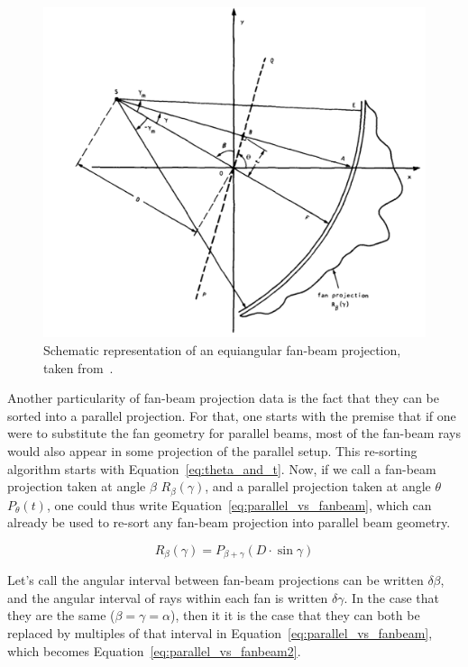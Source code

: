 \begin{figure}[htpb]
    \centering
    \includegraphics[width=.8\textwidth]{img/png/fig319.png}
    \caption{Schematic representation of an equiangular fan-beam
    projection, taken from~\cite{Kak2001}.}
    \label{fig:equiangular}
\end{figure}

Another particularity of fan-beam projection data is the fact that they
can be sorted into a parallel projection. For that, one starts with the
premise that if one were to substitute the fan geometry for parallel
beams, most of the fan-beam rays would also appear in some projection of
the parallel setup. This re-sorting algorithm starts with
Equation~\ref{eq:theta_and_t}. Now, if we call a fan-beam projection
taken at angle $\beta$ $R_{\beta}(\gamma)$, and a parallel projection
taken at angle $\theta$ $P_{\theta}(t)$, one could thus write
Equation~\ref{eq:parallel_vs_fanbeam}, which can already be used to
re-sort any fan-beam projection into parallel beam geometry.

\begin{equation}
    \label{eq:parallel_vs_fanbeam}
    R_{\beta}(\gamma) = P_{\beta + \gamma}(D \cdot \sin \gamma)
\end{equation}

Let's call the angular interval between fan-beam projections can be
written $\delta\beta$, and the angular interval of rays within each fan
is written $\delta\gamma$. In the case that they are the same
($\beta=\gamma=\alpha$), then it it is the case that they can both be
replaced by multiples of that interval in
Equation~\ref{eq:parallel_vs_fanbeam}, which becomes
Equation~\ref{eq:parallel_vs_fanbeam2}.

